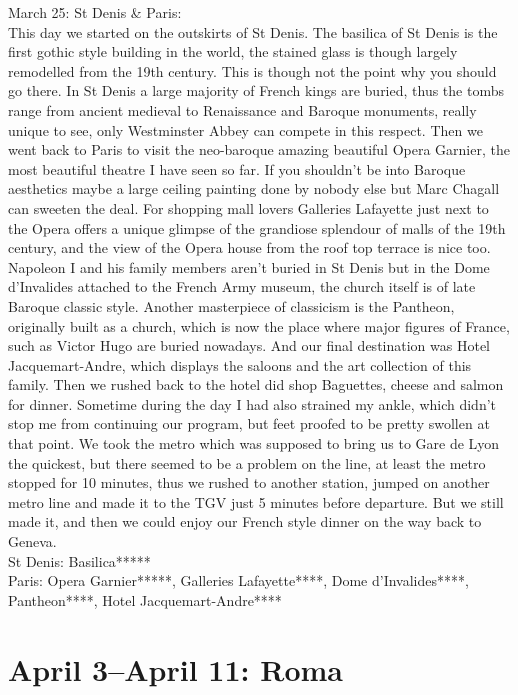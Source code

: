 March 25: St Denis \& Paris:\\
This day we started on the outskirts of St Denis. The basilica of St Denis is the first gothic style building in the world, the stained glass is though largely remodelled from the 19th century. This is though not the point why you should go there. In St Denis a large majority of French kings are buried, thus the tombs range from ancient medieval to Renaissance and Baroque monuments, really unique to see, only Westminster Abbey can compete in this respect. Then we went back to Paris to visit the neo-baroque amazing beautiful Opera Garnier, the most beautiful theatre I have seen so far. If you shouldn't be into Baroque aesthetics maybe a large ceiling painting done by nobody else but Marc Chagall can sweeten the deal. For shopping mall lovers Galleries Lafayette just next to the Opera offers a unique glimpse of the grandiose splendour of malls of the 19th century, and the view of the Opera house from the roof top terrace is nice too. \\
Napoleon I and his family members aren't buried in St Denis but in the Dome d'Invalides attached to the French Army museum, the church itself is of late Baroque classic style. Another masterpiece of classicism is the Pantheon, originally built as a church, which is now the place where major figures of France, such as Victor Hugo are buried nowadays. And our final destination was Hotel Jacquemart-Andre, which displays the saloons and the art collection of this family. Then we rushed back to the hotel did shop Baguettes, cheese and salmon for dinner. Sometime during the day I had also strained my ankle, which didn't stop me from continuing our program, but feet proofed to be pretty swollen at that point. We took the metro which was supposed to bring us to Gare de Lyon the quickest, but there seemed to be a problem on the line, at least the metro stopped for 10 minutes, thus we rushed to another station, jumped on another metro line and made it to the TGV just 5 minutes before departure. But we still made it, and then we could enjoy our French style dinner on the way back to Geneva.\\

St Denis: Basilica*****\\
Paris: Opera Garnier*****, Galleries Lafayette****, Dome d'Invalides****, Pantheon****, Hotel Jacquemart-Andre****

\section{April 3--April 11: Roma}
\label{Roma2013}

